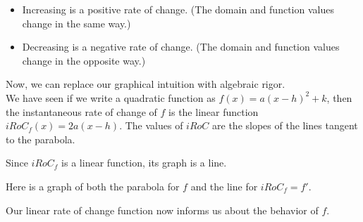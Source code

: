 \documentclass{ximera}
\begin{document}
\begin{itemize}
\item Increasing is a positive rate of change. (The domain and function values change in the same way.)
\item Decreasing is a negative rate of change. (The domain and function values change in the opposite way.)
\end{itemize}



Now, we can replace our graphical intuition with algebraic rigor. \\ 

We have seen if we write a quadratic function as $f(x) = a (x - h)^2 + k$, then the instantaneous rate of change of $f$ is the linear function $iRoC_f(x) = 2 a (x - h)$. The values of $iRoC$ are the slopes of the lines tangent to the parabola.


Since $iRoC_f$ is a linear function, its graph is a line.


Here is a graph of both the parabola for $f$ and the line for $iRoC_f = f'$.







\begin{image}
\end{image}
Our linear rate of change function now informs us about the behavior of $f$. 
\end{document}
